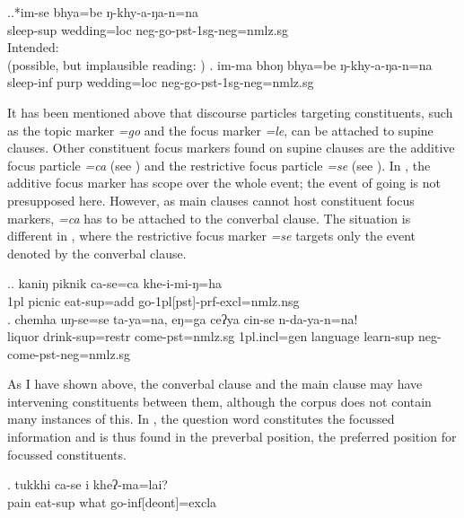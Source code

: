 \ex.\ag.*im-se bhya=be ŋ-khy-a-ŋa-n=na\\
sleep{\sc -sup} wedding{\sc =loc} {\sc neg-}go{\sc -pst-1sg-neg=nmlz.sg}\\
Intended:  \\
(possible, but implausible reading: )
\bg. im-ma bhoŋ bhya=be ŋ-khy-a-ŋa-n=na\\
sleep{\sc -inf} {\sc purp} wedding{\sc =loc} {\sc neg-}go{\sc -pst-1sg-neg=nmlz.sg}\\


It has been  mentioned above that discourse particles targeting constituents, such as the topic marker \emph{=go} and the focus marker \emph{=le}, can be attached to supine clauses. Other constituent focus markers found on supine clauses are the additive focus particle \emph{=ca}  (see \Next[a]) and the restrictive focus particle \emph{=se} (see \Next[b]). In \Next[a], the additive focus marker has scope over the whole event; the event of going is not presupposed here. However, as main clauses cannot host constituent focus markers, \emph{=ca} has to be attached to the converbal clause. The situation is different in \Next[b], where the restrictive focus marker \emph{=se} targets only  the event denoted by the converbal clause.

		
	\ex.\ag.      kaniŋ piknik ca-se=ca                khe-i-mi-ŋ=ha\\
		{\sc 1pl} picnic eat{\sc -sup=add} go{\sc -1pl[pst]-prf-excl=nmlz.nsg}\\
		  
	\bg. chemha uŋ-se=se ta-ya=na, eŋ=ga ceʔya cin-se n-da-ya-n=na!\\
	liquor   drink{\sc -sup=restr} come{\sc [3sg]-pst=nmlz.sg} {\sc 1pl.incl=gen} language   learn{\sc -sup} {\sc neg-}come{\sc [3sg]-pst-neg=nmlz.sg}\\
	
As I have shown above, the converbal clause and the main clause may have intervening constituents between them, although the corpus does not contain many instances of this. In \Next, the question word  constitutes the focussed information and is thus found in the preverbal position, the preferred  position for focussed constituents.

\exg.   tukkhi ca-se      i    kheʔ-ma=lai?\\
		 pain  eat{\sc -sup} what go{\sc -inf[deont]=excla}\\
		  
	

